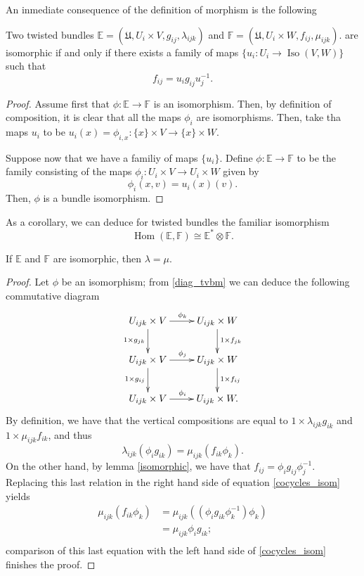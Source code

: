An inmediate consequence of the definition of morphism is the following

\begin{lemma}\label{isomorphic}
Two twisted bundles $\mathbb{E}=(\mathfrak{U},U_i\times V,g_{ij},\lambda_{ijk})$ and $\mathbb{F}=(\mathfrak{U},U_i\times W,f_{ij},\mu_{ijk})$. are isomorphic if and only if there exists a family of maps $\{u_i:U_i\to \operatorname{Iso}(V,W)\}$ such that
$$f_{ij}=u_ig_{ij}u_j^{-1}.$$
\end{lemma}
\begin{proof}
Assume first that $ \phi :\mathbb{E}\to \mathbb{F}$ is an isomorphism. Then, by definition of composition, it is clear that all the maps $\phi_i$ are isomorphisms. Then, take tha maps $u_i$ to be $u_i(x)=\phi_{i,x}:\{x\}\times V\to \{x\}\times W$.

Suppose now that we have a familiy of maps $\{u_i\}$. Define $\phi :\mathbb{E}\to \mathbb{F}$ to be the family consisting of the maps $\phi_i:U_i\times V\to U_i\times W$ given by
$$\phi_i(x,v)=u_i(x)(v).$$
Then, $\phi$ is a bundle isomorphism.
\end{proof}

As a corollary, we can deduce for twisted bundles the familiar isomorphism
$$\operatorname{Hom}(\mathbb{E},\mathbb{F})\cong \mathbb{E}^*\otimes \mathbb{F}.$$

\begin{lemma}\label{iso_twistings}
If $\mathbb{E}$ and $\mathbb{F}$ are isomorphic, then $\lambda =\mu$.
\end{lemma}
\begin{proof}
Let $\phi$ be an isomorphism; from \eqref{diag_tvbm} we can deduce the following commutative diagram
\begin{equation}\label{diag_tvb2}
\xymatrix{
U_{ijk}\times V \ar[r]^{\phi_k} \ar[d]_{1\times g_{jk}} & U_{ijk}\times W \ar[d]^{1\times f_{jk}} \\
U_{ijk}\times V \ar[r]^{\phi_j} \ar[d]_{1\times g_{ij}} & U_{ijk}\times W \ar[d]^{1\times f_{ij}} \\
U_{ijk}\times V \ar[r]^{\phi_i} & U_{ijk}\times W. }
\end{equation}
By definition, we have that the vertical compositions are equal to $1\times \lambda_{ijk}g_{ik}$ and $1\times \mu_{ijk}f_{ik}$, and thus
\begin{equation}\label{cocycles_isom}
\lambda_{ijk}(\phi_ig_{ik})=\mu_{ijk}(f_{ik}\phi_k).
\end{equation}
On the other hand, by lemma \ref{isomorphic}, we have that $f_{ij}=\phi_ig_{ij}\phi_j^{-1}$. Replacing this last relation in the right hand side of equation \eqref{cocycles_isom} yields
$$
\begin{aligned}
\mu_{ijk}(f_{ik}\phi_k) &= \mu_{ijk}((\phi_ig_{ik}\phi_k^{-1})\phi_k) \\
                        &= \mu_{ijk}\phi_ig_{ik}; \\
\end{aligned}
$$
comparison of this last equation with the left hand side of \eqref{cocycles_isom} finishes the proof.
\end{proof}

